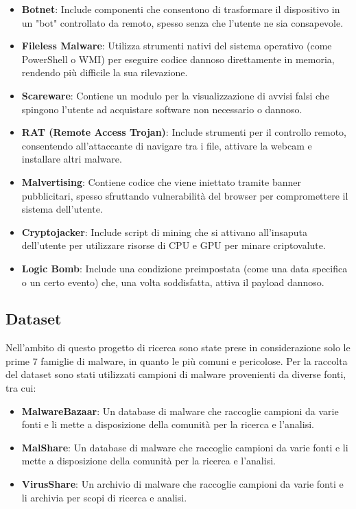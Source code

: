 \begin{itemize}
    \item \textbf{Botnet}: Include componenti che consentono di trasformare il dispositivo in un "bot" controllato da remoto, spesso senza che l'utente ne sia consapevole.
    \item \textbf{Fileless Malware}: Utilizza strumenti nativi del sistema operativo (come PowerShell o WMI) per eseguire codice dannoso direttamente in memoria, rendendo più difficile la sua rilevazione.
    \item \textbf{Scareware}: Contiene un modulo per la visualizzazione di avvisi falsi che spingono l'utente ad acquistare software non necessario o dannoso.
    \item \textbf{RAT (Remote Access Trojan)}: Include strumenti per il controllo remoto, consentendo all'attaccante di navigare tra i file, attivare la webcam e installare altri malware.
    \item \textbf{Malvertising}: Contiene codice che viene iniettato tramite banner pubblicitari, spesso sfruttando vulnerabilità del browser per compromettere il sistema dell'utente.
    \item \textbf{Cryptojacker}: Include script di mining che si attivano all'insaputa dell'utente per utilizzare risorse di CPU e GPU per minare criptovalute.
    \item \textbf{Logic Bomb}: Include una condizione preimpostata (come una data specifica o un certo evento) che, una volta soddisfatta, attiva il payload dannoso.
\end{itemize}

\subsection{Dataset}
Nell'ambito di questo progetto di ricerca sono state prese in considerazione solo le prime 7 famiglie di malware, in quanto le più comuni e pericolose. Per la raccolta del dataset sono stati utilizzati campioni di malware provenienti da diverse fonti, tra cui:
\begin{itemize}
    \item \textbf{MalwareBazaar}: Un database di malware che raccoglie campioni da varie fonti e li mette a disposizione della comunità per la ricerca e l'analisi.
    \item \textbf{MalShare}: Un database di malware che raccoglie campioni da varie fonti e li mette a disposizione della comunità per la ricerca e l'analisi.
    \item \textbf{VirusShare}: Un archivio di malware che raccoglie campioni da varie fonti e li archivia per scopi di ricerca e analisi.
\end{itemize}

